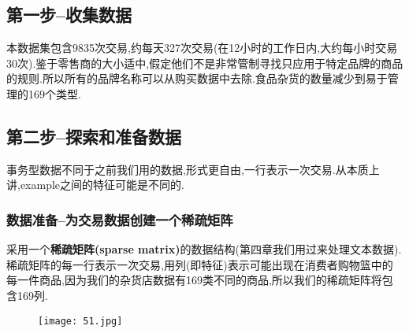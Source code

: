 \documentclass[11pt,a4paper,oneside]{book}
\begin{document}
\subsection{第一步--收集数据}
本数据集包含9835次交易,约每天327次交易(在12小时的工作日内,大约每小时交易30次).鉴于零售商的大小适中,假定他们不是非常管制寻找只应用于特定品牌的商品的规则.所以所有的品牌名称可以从购买数据中去除.食品杂货的数量减少到易于管理的169个类型.
\subsection{第二步--探索和准备数据}
事务型数据不同于之前我们用的数据,形式更自由,一行表示一次交易.从本质上讲,example之间的特征可能是不同的.
\subsubsection{数据准备--为交易数据创建一个稀疏矩阵}
采用一个\textbf{稀疏矩阵(sparse matrix)}的数据结构(第四章我们用过来处理文本数据).稀疏矩阵的每一行表示一次交易,用列(即特征)表示可能出现在消费者购物篮中的每一件商品,因为我们的杂货店数据有169类不同的商品,所以我们的稀疏矩阵将包含169列.

\begin{figure}[H]
	\centering
	\texttt{[image: 51.jpg]}
\end{figure}
\end{document}

